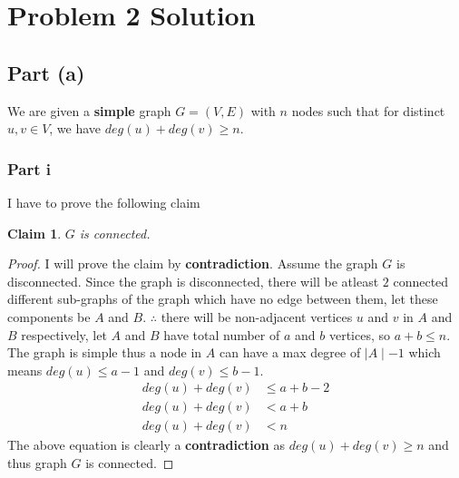\documentclass{article}
\let\bold\textbf
\newtheorem{claim}{Claim}[subsection]
\begin{document}
\section{Problem 2 Solution}{
  \subsection{Part (a)}{
    We are given a \bold{simple} graph $G=(V,E)$ with $n$ nodes such that for distinct $u,v \in V$, we have $deg(u)+deg(v)\geq n$.
    \subsubsection{Part i}{
      I have to prove the following claim
      \begin{claim}
        $G$ is connected.
      \end{claim}
      \begin{proof}
        I will prove the claim by \bold{contradiction}. \newline
        Assume the graph $G$ is disconnected. \newline
        Since the graph is disconnected, there will be atleast $2$ connected different sub-graphs of the graph which have no edge between them, let these components be $A$ and $B$. \newline
        $\therefore$ there will be non-adjacent vertices $u$ and $v$ in $A$ and $B$ respectively, let $A$ and $B$ have total number of $a$ and $b$ vertices, so $a+b \leq n$. \newline
        The graph is simple thus a node in $A$ can have a max degree of $\mid A\mid -1$ which means $deg(u) \leq a-1$ and $deg(v) \leq b-1$.
        \begin{align*}
          deg(u)+deg(v) &\leq a+b-2 \\
          deg(u)+deg(v) &< a+b \\
          deg(u)+deg(v) &< n
        \end{align*}
        The above equation is clearly a \bold{contradiction} as $deg(u)+deg(v) \geq n$ and thus graph $G$ is connected.
      \end{proof}
    }
}}
\end{document}

